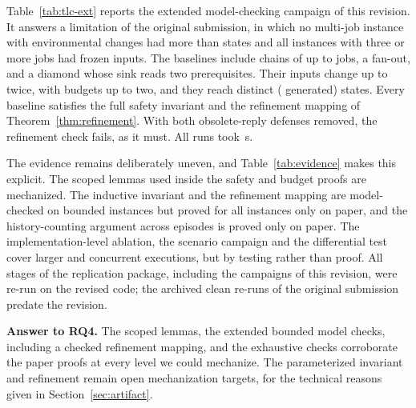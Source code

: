 

Table~\ref{tab:tlc-ext} reports the extended model-checking campaign of this revision. It answers a limitation of the original submission, in which no multi-job instance with environmental changes had more than \TLCMaxStates{} states and all instances with three or more jobs had frozen inputs. The \TLCExtBaselines{} baselines include chains of up to \TLCExtMaxJobs{} jobs, a fan-out, and a diamond whose sink reads two prerequisites. Their inputs change up to twice, with budgets up to two, and they reach \TLCExtMaxStates{} distinct (\TLCExtMaxGenerated{} generated) states. Every baseline satisfies the full safety invariant and the refinement mapping of Theorem~\ref{thm:refinement}. With both obsolete-reply defenses removed, the refinement check fails, as it must. All \TLCExtRuns{} runs took \TLCExtSeconds\,s.



The evidence remains deliberately uneven, and Table~\ref{tab:evidence} makes this explicit. The scoped lemmas used inside the safety and budget proofs are mechanized. The inductive invariant and the refinement mapping are model-checked on bounded instances but proved for all instances only on paper, and the history-counting argument across episodes is proved only on paper. The implementation-level ablation, the scenario campaign and the differential test cover larger and concurrent executions, but by testing rather than proof. All stages of the replication package, including the campaigns of this revision, were re-run on the revised code; the archived clean re-runs of the original submission predate the revision.

\textbf{Answer to RQ4.} The scoped lemmas, the extended bounded model checks, including a checked refinement mapping, and the exhaustive checks corroborate the paper proofs at every level we could mechanize. The parameterized invariant and refinement remain open mechanization targets, for the technical reasons given in Section~\ref{sec:artifact}.




